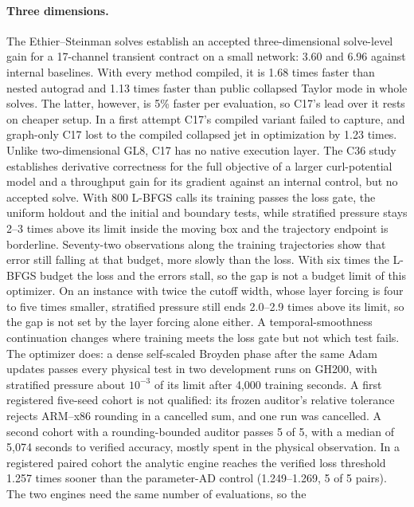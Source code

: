\documentclass[11pt]{article}
\begin{document}
\paragraph{Three dimensions.}
The Ethier--Steinman solves establish an accepted three-dimensional
solve-level gain for a 17-channel transient contract on a small network:
3.60 and 6.96 against internal baselines. With every method compiled, it
is 1.68 times faster than nested autograd and 1.13 times faster than public
collapsed Taylor mode in whole solves. The latter, however, is 5\% faster per
evaluation, so C17's lead over it rests on cheaper setup. In a first attempt
C17's compiled variant failed to capture, and graph-only C17 lost to the
compiled collapsed jet in optimization by 1.23 times. Unlike two-dimensional
GL8, C17 has no native execution layer. The C36 study establishes
derivative correctness for the full objective of a larger curl-potential
model and a throughput gain for its gradient against an internal control,
but no accepted solve. With 800 L-BFGS calls its training passes the loss
gate, the uniform holdout and the initial and boundary tests, while
stratified pressure stays 2--3 times above its limit inside the moving box
and the trajectory endpoint is borderline. Seventy-two observations along
the training trajectories show that error still falling at that budget,
more slowly than the loss. With six times the L-BFGS budget the loss and the
errors stall, so the gap is not a budget limit of this optimizer. On an
instance with twice the cutoff width, whose layer forcing is four to five
times smaller, stratified pressure still ends 2.0--2.9 times above its
limit, so the gap is not set by the layer forcing alone either. A
temporal-smoothness continuation changes where training meets the loss gate
but not which test fails. The optimizer does: a dense self-scaled Broyden
phase after the same Adam updates passes every physical test in two
development runs on GH200, with stratified pressure about $10^{-3}$ of its
limit after 4,000 training seconds. A first registered five-seed cohort is
not qualified: its frozen auditor's relative tolerance rejects ARM--x86
rounding in a cancelled sum, and one run was cancelled. A second cohort
with a rounding-bounded auditor passes 5 of 5, with a median of 5,074
seconds to verified accuracy, mostly spent in the physical observation.
In a registered paired cohort the analytic engine reaches the verified loss
threshold 1.257 times sooner than the parameter-AD control (1.249--1.269,
5 of 5 pairs). The two engines need the same number of evaluations, so the
\end{document}
